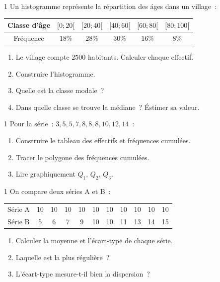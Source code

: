 \begin{exo}{1}
Un histogramme repr\'esente la r\'epartition des \'ages dans un village~:
\begin{center}
\begin{tabular}{|c|c|c|c|c|c|}
\hline
\rowcolor{BN!10}
Classe d'\^age & $[0;20[$ & $[20;40[$ & $[40;60[$ & $[60;80[$ & $[80;100[$ \\
\hline
Fr\'equence & $18\%$ & $28\%$ & $30\%$ & $16\%$ & $8\%$ \\
\hline
\end{tabular}
\end{center}
\begin{enumerate}
  \item Le village compte $2500$ habitants. Calculer chaque effectif.
  \item Construire l'histogramme.
  \item Quelle est la classe modale~?
  \item Dans quelle classe se trouve la m\'ediane~? \'Estimer sa valeur.
\end{enumerate}
\end{exo}

\begin{exo}{1}
Pour la s\'erie~: $3, 5, 5, 7, 8, 8, 8, 10, 12, 14$~:
\begin{enumerate}
  \item Construire le tableau des effectifs et fr\'equences cumul\'ees.
  \item Tracer le polygone des fr\'equences cumul\'ees.
  \item Lire graphiquement $Q_1$, $Q_2$, $Q_3$.
\end{enumerate}
\end{exo}

\begin{exo}{1}
On compare deux s\'eries A et B~:
\begin{center}
\begin{tabular}{|c|cccccccccc|}
\hline
\rowcolor{BN!10} S\'erie A & 10 & 10 & 10 & 10 & 10 & 10 & 10 & 10 & 10 & 10 \\
S\'erie B & 5 & 6 & 7 & 9 & 10 & 10 & 11 & 13 & 14 & 15 \\
\hline
\end{tabular}
\end{center}
\begin{enumerate}
  \item Calculer la moyenne et l'\'ecart-type de chaque s\'erie.
  \item Laquelle est la plus r\'eguli\`ere~?
  \item L'\'ecart-type mesure-t-il bien la dispersion~?
\end{enumerate}
\end{exo}

